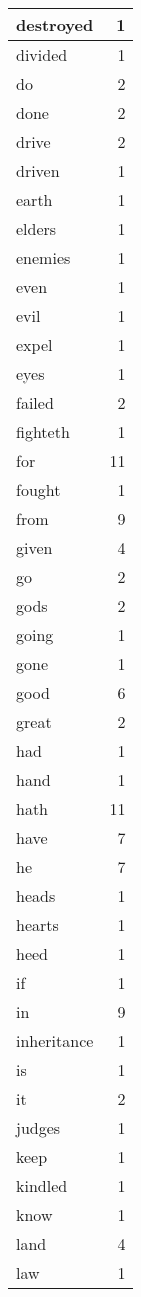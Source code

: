 \begin{center}
\begin{longtable}{l|r}
destroyed & 1\\ \hline 
divided & 1\\ \hline 
do & 2\\ \hline 
done & 2\\ \hline 
drive & 2\\ \hline 
driven & 1\\ \hline 
earth & 1\\ \hline 
elders & 1\\ \hline 
enemies & 1\\ \hline 
even & 1\\ \hline 
evil & 1\\ \hline 
expel & 1\\ \hline 
eyes & 1\\ \hline 
failed & 2\\ \hline 
fighteth & 1\\ \hline 
for & 11\\ \hline 
fought & 1\\ \hline 
from & 9\\ \hline 
given & 4\\ \hline 
go & 2\\ \hline 
gods & 2\\ \hline 
going & 1\\ \hline 
gone & 1\\ \hline 
good & 6\\ \hline 
great & 2\\ \hline 
had & 1\\ \hline 
hand & 1\\ \hline 
hath & 11\\ \hline 
have & 7\\ \hline 
he & 7\\ \hline 
heads & 1\\ \hline 
hearts & 1\\ \hline 
heed & 1\\ \hline 
if & 1\\ \hline 
in & 9\\ \hline 
inheritance & 1\\ \hline 
is & 1\\ \hline 
it & 2\\ \hline 
judges & 1\\ \hline 
keep & 1\\ \hline 
kindled & 1\\ \hline 
know & 1\\ \hline 
land & 4\\ \hline 
law & 1\\ \hline 

\end{longtable}
\end{center}
